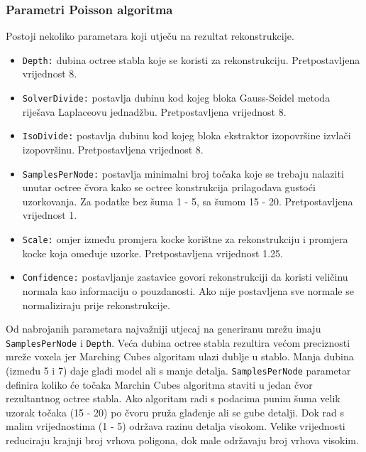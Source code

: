 \subsubsection{Parametri Poisson algoritma} %
\label{ssub:Parametri Poisson algoritma}
Postoji nekoliko parametara koji utječu na rezultat rekonstrukcije.
\begin{itemize}
    \item \texttt{Depth:} dubina octree stabla koje se koristi za
        rekonstrukciju. Pretpostavljena vrijednost 8.
    \item \texttt{SolverDivide:} postavlja dubinu kod kojeg bloka
        Gauss-Seidel metoda riješava Laplaceovu jednadžbu. Pretpostavljena
        vrijednost 8.
    \item \texttt{IsoDivide:} postavlja dubinu kod kojeg bloka
        ekstraktor izopovršine izvlači izopovršinu. Pretpostavljena vrijednost
        8.
    \item \texttt{SamplesPerNode:} postavlja minimalni broj točaka koje
        se trebaju nalaziti unutar octree čvora kako se octree
        konstrukcija prilagođava gustoći uzorkovanja. Za podatke bez
        šuma 1 - 5, sa šumom 15 - 20. Pretpostavljena vrijednost 1.
    \item \texttt{Scale:} omjer između promjera kocke korištne za
        rekonstrukciju i promjera kocke koja omeđuje uzorke. Pretpostavljena
        vrijednost 1.25.
    \item \texttt{Confidence:} postavljanje zastavice govori
        rekonstrukciji da koristi veličinu normala kao informaciju o
        pouzdanosti. Ako nije postavljena sve normale se normaliziraju
        prije rekonstrukcije.
\end{itemize}

Od nabrojanih parametara najvažniji utjecaj na generiranu mrežu imaju
\texttt{SamplesPerNode} i \texttt{Depth}. Veća dubina octree stabla
rezultira većom preciznosti mreže voxela jer Marching Cubes algoritam
ulazi dublje u stablo. Manja dubina (između 5 i 7) daje glađi model ali
s manje detalja. \texttt{SamplesPerNode} parametar definira koliko će
točaka Marchin Cubes algoritma staviti u jedan čvor rezultantnog octree
stabla. Ako algoritam radi s podacima punim šuma velik uzorak točaka (15
- 20) po čvoru pruža glađenje ali se gube detalji. Dok rad s malim
vrijednostima (1 - 5) održava razinu detalja visokom. Velike vrijednosti
reduciraju krajnji broj vrhova poligona, dok male održavaju broj vrhova
visokim.



